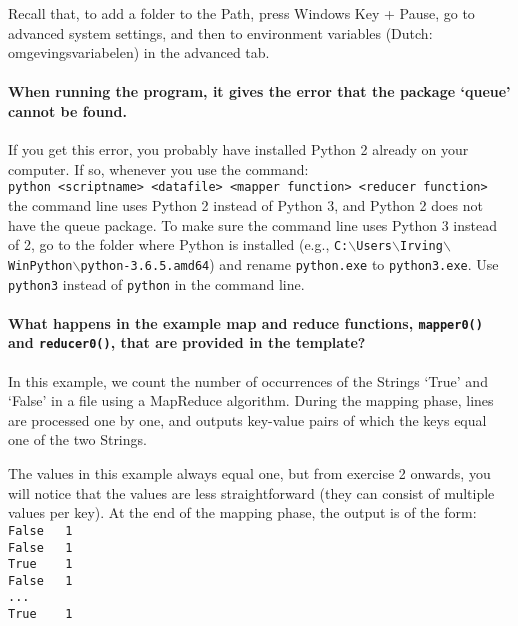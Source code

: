 \documentclass[a4paper]{report}
\theoremstyle{definition}
\begin{document}
Recall that, to add a folder to the Path, press Windows Key + Pause, go to advanced system settings, and then to environment variables (Dutch: omgevingsvariabelen) in the advanced tab.

\paragraph{When running the program, it gives the error that the package `queue' cannot be found.}
If you get this error, you probably have installed Python 2 already on your computer. If so, whenever you use the command:\\

\noindent \texttt{python <scriptname> <datafile> <mapper function> <reducer function>}\\

\noindent the command line uses Python 2 instead of Python 3, and Python 2 does not have the queue package. To make sure the command line uses Python 3 instead of 2, go to the folder where Python is installed  (e.g., \texttt{C:$\backslash{}$Users$\backslash{}$Irving$\backslash{}$WinPython$\backslash{}$python-3.6.5.amd64}) and rename \texttt{python.exe} to \texttt{python3.exe}. Use \texttt{python3} instead of \texttt{python} in the command line.

\paragraph{What happens in the example map and reduce functions, \texttt{mapper0()} and \texttt{reducer0()}, that are provided in the template?}
In this example, we count the number of occurrences of the Strings `True' and `False' in a file using a MapReduce algorithm. During the mapping phase, lines are processed one by one, and outputs key-value pairs of which the keys equal one of the two Strings. 

The values in this example always equal one, but from exercise 2 onwards, you will notice that the values are less straightforward (they can consist of multiple values per key). At the end of the mapping phase, the output is of the form:\\

\noindent \texttt{False~~~1}\\
\noindent \texttt{False~~~1}\\
\noindent \texttt{True~~~~1}\\
\noindent \texttt{False~~~1}\\
\noindent \texttt{...}\\
\noindent \texttt{True~~~~1}\\
\end{document}
